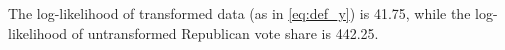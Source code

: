 The log-likelihood of transformed data (as in \eqref{eq:def_y}) is 41.75, while the log-likelihood of untransformed Republican vote share is 442.25.%